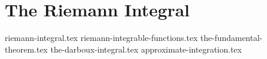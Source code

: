 \chapter{The Riemann Integral}
{riemann-integral.tex}
{riemann-integrable-functions.tex}
{the-fundamental-theorem.tex}
{the-darboux-integral.tex}
{approximate-integration.tex}
